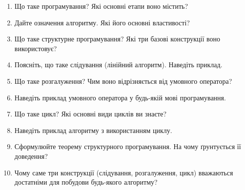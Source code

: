 \begin{enumerate}
	\item Що таке програмування? Які основні етапи воно містить?
	\item Дайте означення алгоритму. Які його основні властивості?
	\item Що таке структурне програмування? Які три базові конструкції воно використовує?
	\item Поясніть, що таке слідування (лінійний алгоритм). Наведіть приклад.
	\item Що таке розгалуження? Чим воно відрізняється від умовного оператора?
	\item Наведіть приклад умовного оператора у будь-якій мові програмування.
	\item Що таке цикл? Які основні види циклів ви знаєте?
	\item Наведіть приклад алгоритму з використанням циклу.
	\item Сформулюйте теорему структурного програмування. На чому ґрунтується її доведення?
	\item Чому саме три конструкції (слідування, розгалуження, цикл) вважаються достатніми для побудови будь-якого алгоритму?
\end{enumerate}

	
	
	
	
	

